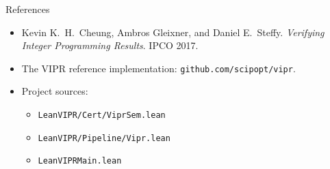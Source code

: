 \documentclass[aspectratio=169,11pt]{beamer}
\newcommand{\vipr}{\textsc{VIPR}}
\newcommand{\code}[1]{\texttt{#1}}
\begin{document}
\begin{frame}{References}
  \small
  \begin{itemize}
    \item Kevin K.\ H.\ Cheung, Ambros Gleixner, and Daniel E.\ Steffy.
          \emph{Verifying Integer Programming Results}. IPCO 2017.
    \item The \vipr{} reference implementation: \code{github.com/scipopt/vipr}.
    \item Project sources:
      \begin{itemize}
        \item \code{LeanVIPR/Cert/ViprSem.lean}
        \item \code{LeanVIPR/Pipeline/Vipr.lean}
        \item \code{LeanVIPRMain.lean}
      \end{itemize}
  \end{itemize}
\end{frame}
\end{document}
